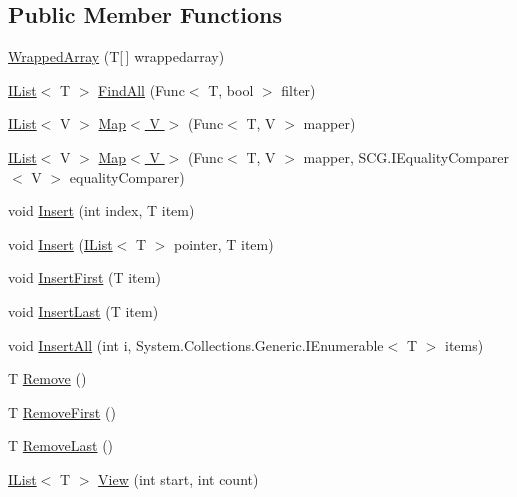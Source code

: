 \subsection*{Public Member Functions}
\begin{DoxyCompactItemize}
\item 
\hyperlink{class_c5_1_1_wrapped_array_a7d88d155c44a39f221d1cc2739abe290}{Wrapped\+Array} (T\mbox{[}$\,$\mbox{]} wrappedarray)
\item 
\hyperlink{interface_c5_1_1_i_list}{I\+List}$<$ T $>$ \hyperlink{class_c5_1_1_wrapped_array_a6580cb9eae8a2c617ed0d5ccbb669464}{Find\+All} (Func$<$ T, bool $>$ filter)
\item 
\hyperlink{interface_c5_1_1_i_list}{I\+List}$<$ V $>$ \hyperlink{class_c5_1_1_wrapped_array_a319143ffc0237155b5633e4e5c61b474}{Map$<$ V $>$} (Func$<$ T, V $>$ mapper)
\item 
\hyperlink{interface_c5_1_1_i_list}{I\+List}$<$ V $>$ \hyperlink{class_c5_1_1_wrapped_array_a9297d4f2de04f4d3f72892992b702810}{Map$<$ V $>$} (Func$<$ T, V $>$ mapper, S\+C\+G.\+I\+Equality\+Comparer$<$ V $>$ equality\+Comparer)
\item 
void \hyperlink{class_c5_1_1_wrapped_array_a162b36f103f13696b002174169d73aed}{Insert} (int index, T item)
\item 
void \hyperlink{class_c5_1_1_wrapped_array_a25630c81bea9df1f81d947bc4315b1e4}{Insert} (\hyperlink{interface_c5_1_1_i_list}{I\+List}$<$ T $>$ pointer, T item)
\item 
void \hyperlink{class_c5_1_1_wrapped_array_a788dd6164116d45b8043fd515a707e6d}{Insert\+First} (T item)
\item 
void \hyperlink{class_c5_1_1_wrapped_array_abe9ea4b00b84b312e033eabfb35d5d77}{Insert\+Last} (T item)
\item 
void \hyperlink{class_c5_1_1_wrapped_array_a8dfe7a28dc0f1b1a3b3548d3cfdd3959}{Insert\+All} (int i, System.\+Collections.\+Generic.\+I\+Enumerable$<$ T $>$ items)
\item 
T \hyperlink{class_c5_1_1_wrapped_array_a067a9891e0d7519b30a726a204d64237}{Remove} ()
\item 
T \hyperlink{class_c5_1_1_wrapped_array_a3b3917acf620f16ef736b75f25d4a8e3}{Remove\+First} ()
\item 
T \hyperlink{class_c5_1_1_wrapped_array_a04f236941c2f7aef12997e6d305a1dcf}{Remove\+Last} ()
\item 
\hyperlink{interface_c5_1_1_i_list}{I\+List}$<$ T $>$ \hyperlink{class_c5_1_1_wrapped_array_ab16f34d78c06b05f4d962192a4daf4c4}{View} (int start, int count)

\end{DoxyCompactItemize}

